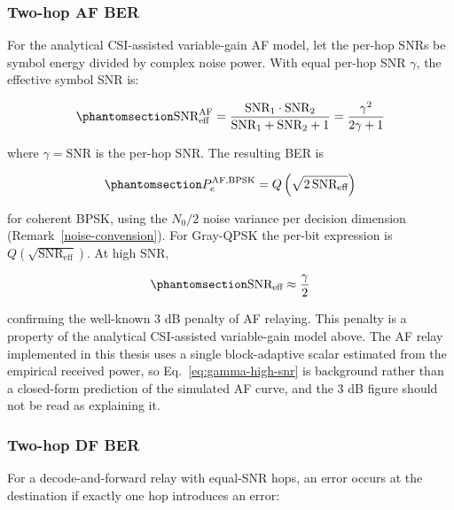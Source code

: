 \subsubsection{Two-hop AF BER}\label{sec:awgn-two-hop-af-ber}
For the analytical CSI-assisted variable-gain AF model, let the per-hop SNRs be symbol energy divided by complex noise power. With equal per-hop SNR $\gamma$, the effective symbol SNR is:

\begin{equation}\protect\phantomsection\label{eq:af-snr-eff}{\text{SNR}_{\text{eff}}^{\text{AF}} = \frac{\text{SNR}_1 \cdot \text{SNR}_2}{\text{SNR}_1 + \text{SNR}_2 + 1} = \frac{\gamma^2}{2\gamma + 1}
}\end{equation}

where
\(\gamma = \text{SNR}\) is the per-hop SNR. The resulting BER is

\begin{equation}\protect\phantomsection\label{eq:af-p-eff}{P_e^{\text{AF,BPSK}} = Q\left(\sqrt{2\,\text{SNR}_{\text{eff}}}\right)
}\end{equation}

for coherent BPSK, using the $N_0/2$ noise variance per decision dimension (Remark~\ref{noise-convension}). For Gray-QPSK the per-bit expression is $Q(\sqrt{\text{SNR}_{\text{eff}}})$. At high SNR,

\begin{equation}\protect\phantomsection\label{eq:gamma-high-snr}{\text{SNR}_{\text{eff}} \approx \frac{\gamma}{2}}
\end{equation}

confirming the well-known 3 dB penalty of AF relaying. This penalty is a property of the analytical CSI-assisted variable-gain model above. The AF relay implemented in this thesis uses a single block-adaptive scalar estimated from the empirical received power, so Eq.~\eqref{eq:gamma-high-snr} is background rather than a closed-form prediction of the simulated AF curve, and the 3 dB figure should not be read as explaining it.

\subsubsection{Two-hop DF BER}\label{sec:awgn-two-hop-df-ber}
For a decode-and-forward relay with equal-SNR hops, an error occurs at the destination if exactly one hop introduces an error:

